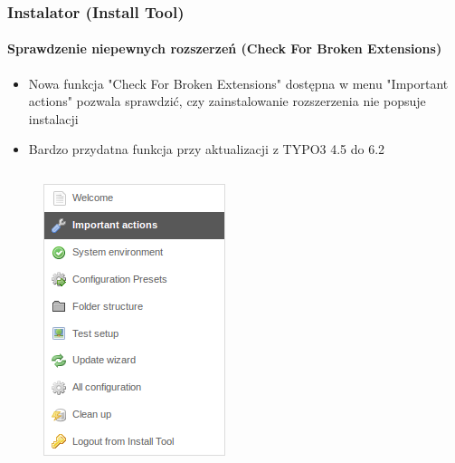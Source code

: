 \begin{frame}[fragile]
	\frametitle{Instalator (Install Tool)}
	\framesubtitle{Sprawdzenie niepewnych rozszerzeń (Check For Broken Extensions)}

	\begin{itemize}
		\item Nowa funkcja "Check For Broken Extensions" dostępna w menu "Important actions" pozwala sprawdzić,\newline
			czy zainstalowanie rozszerzenia nie popsuje instalacji
		\item Bardzo przydatna funkcja przy aktualizacji z TYPO3 4.5 do 6.2
	\end{itemize}

	\begin{columns}[T]
		\begin{column}{.3\textwidth}
			\begin{figure}\vspace*{-0.4cm}
				\includegraphics[width=0.7\linewidth]{Images/InstallTool/ImportantActions.png}
			\end{figure}
		\end{column}
		\begin{column}{.7\textwidth}
			\begin{figure}\vspace*{-0.4cm}

\end{figure}
\end{column}
\end{columns}
\end{frame}
